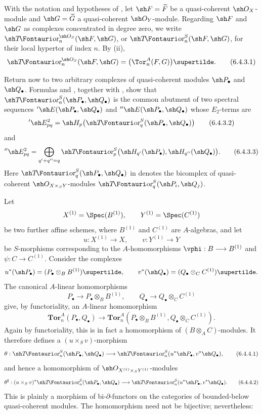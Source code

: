 \begin{env}[6.4.3]
\label{III.6.4.3}
With the notation and hypotheses of , let
$\sh F=\widetilde F$ be a quasi-coherent $\sh O_X$-module and
$\sh G=\widetilde G$ a quasi-coherent $\sh O_Y$-module.  Regarding
$\sh F$ and $\sh G$ as complexes concentrated in degree zero, we
write $\shTor_n^{\sh O_S}(\sh F,\sh G)$, or
$\shTor_n^S(\sh F,\sh G)$, for their local hypertor of index $n$.
By (ii),
\[
  \shTor_n^{\sh O_S}(\sh F,\sh G)
  =
  \bigl(\Tor_n^A(F,G)\bigr)\supertilde.
  \tag{6.4.3.1}\label{III.6.4.3.1}
\]

Return now to two arbitrary complexes of quasi-coherent modules
$\sh P_\bullet$ and $\sh Q_\bullet$.  Formulas
 and , together with
, show that
$\shTor_n^S(\sh P_\bullet,\sh Q_\bullet)$ is the common abutment
of two spectral sequences
$'\sh E(\sh P_\bullet,\sh Q_\bullet)$ and
$''\sh E(\sh P_\bullet,\sh Q_\bullet)$ whose $E_2$-terms are
\[
  '\sh E_{pq}^2
  =
  \sh H_p\bigl(\shTor_q^S(\sh P_\bullet,\sh Q_\bullet)\bigr)
  \tag{6.4.3.2}\label{III.6.4.3.2}
\]
and
\[
  ''\sh E_{pq}^2
  =
  \bigoplus_{q'+q''=q}
  \shTor_p^S
  \bigl(\sh H_{q'}(\sh P_\bullet),
        \sh H_{q''}(\sh Q_\bullet)\bigr).
  \tag{6.4.3.3}\label{III.6.4.3.3}
\]
Here $\shTor_q^S(\sh P_\bullet,\sh Q_\bullet)$ in
 denotes the bicomplex of quasi-coherent
$\sh O_{X\times_SY}$-modules
$\shTor_q^S(\sh P_i,\sh Q_j)$.
\end{env}

\begin{env}[6.4.4]
\label{III.6.4.4}
Let
\[
  X^{(1)}=\Spec(B^{(1)}),
  \qquad
  Y^{(1)}=\Spec(C^{(1)})
\]
be two further affine schemes, where $B^{(1)}$ and $C^{(1)}$ are
$A$-algebras, and let
\[
  u:X^{(1)}\longrightarrow X,
  \qquad
  v:Y^{(1)}\longrightarrow Y
\]
be $S$-morphisms corresponding to the $A$-homomorphisms
$\vphi:B\longrightarrow B^{(1)}$ and
$\psi:C\longrightarrow C^{(1)}$.  Consider the complexes
\[
  u^*(\sh P_\bullet)
  =
  (P_\bullet\otimes_BB^{(1)})\supertilde,
  \qquad
  v^*(\sh Q_\bullet)
  =
  (Q_\bullet\otimes_CC^{(1)})\supertilde.
\]
The canonical $A$-linear homomorphisms
\[
  P_\bullet\longrightarrow P_\bullet\otimes_BB^{(1)},
  \qquad
  Q_\bullet\longrightarrow Q_\bullet\otimes_CC^{(1)}
\]
give, by functoriality, an $A$-linear homomorphism
\[
  \mathbf{Tor}_n^A(P_\bullet,Q_\bullet)
  \longrightarrow
  \mathbf{Tor}_n^A
  (P_\bullet\otimes_BB^{(1)},
   Q_\bullet\otimes_CC^{(1)}).
\]
Again by functoriality, this is in fact a homomorphism of
$(B\otimes_AC)$-modules.  It therefore defines a
$(u\times_Sv)$-morphism
\[
  \theta:
  \shTor_n^S(\sh P_\bullet,\sh Q_\bullet)
  \longrightarrow
  \shTor_n^S(u^*\sh P_\bullet,v^*\sh Q_\bullet),
  \tag{6.4.4.1}\label{III.6.4.4.1}
\]
and hence a homomorphism of
$\sh O_{X^{(1)}\times_SY^{(1)}}$-modules
\[
  \theta^\sharp:
  (u\times_Sv)^*
  \shTor_n^S(\sh P_\bullet,\sh Q_\bullet)
  \longrightarrow
  \shTor_n^S(u^*\sh P_\bullet,v^*\sh Q_\bullet).
  \tag{6.4.4.2}\label{III.6.4.4.2}
\]
This is plainly a morphism of bi-$\partial$-functors on the
categories of bounded-below quasi-coherent modules.  The
homomorphism  need not be bijective; nevertheless:
\end{env}

